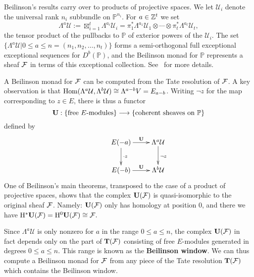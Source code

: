 \documentclass[twoside,12pt, leqno]{amsart}
\def\PP{{\mathbb P}}
\DeclareMathOperator{\rH}{{\rm H}}
\def\bT{{\bf T}}
\def\bU{{\bf U}}
\def\rH{{\rm H}}
\def\CU{{\mathcal U}}
\begin{document}


Beilinson's results carry over to products of projective spaces.  We let $\CU_i$ denote the universal rank $n_i$ subbundle on $\PP^{n_i}$.  For $a\in {\mathbb Z}^{t}$ we set
$$
\Lambda^a \CU := \boxtimes_{i=1}^t \Lambda^{a_i} \CU_i=\pi_1^*\Lambda^{a_1}\CU_1 \otimes \cdots \otimes \pi_t^*\Lambda^{a_t} \CU_t,
$$
the tensor product of the pullbacks to $\PP$ of exterior powers of the $\CU_i$. The set $\{\Lambda^a \CU | 0 \leq a \leq n=(n_1,n_2,\dots,n_t)\}$ forms a semi-orthogonal full exceptional exceptional sequences for $D^b(\PP)$, and the Beilinson monad for $\PP$ represents a sheaf ${\mathcal F}$ in terms of this exceptional collection.  See~\cite[\S2]{EES} for more details.

A Beilinson monad for ${\mathcal F}$ can be computed from the Tate resolution of ${\mathcal F}$.  A key observation is that $\Hom(\Lambda^a \CU,\Lambda^b\CU) \cong \Lambda^{a-b} V=E_{a-b}$.  Writing $\neg z$ for the map corresponding to $z\in E$, there is thus a functor
\[
\bU: \{ \hbox{free $E$-modules}\} \longrightarrow \{ \hbox{coherent sheaves on $\PP$} \}  
\] defined by
\[
\xymatrix{
&E(-a)\ar[r]^-{\bU}\ar[d]^-{\cdot z}&\Lambda^a \CU\ar[d]^{\neg z}\\
&E(-b)\ar[r]^-{\bU}&\Lambda^b \CU\\
}
\]
One of Beilinson's main theorems, transposed to the case of a product of projective spaces, shows that the complex $\bU(\sF)$ is quasi-isomorphic to the original sheaf ${\mathcal F}$.  Namely: $\bU(\sF)$ only has homology at position $0$, and there we have $ \rH^* \bU(\sF) = \rH^0 \bU(\sF) \cong \sF.$

Since  $\Lambda^a \CU$ is only nonzero for $a$ in the range $0 \le a \le n$, the complex $\bU(\sF)$ in fact depends only on the  part of $\bT(\sF)$ consisting of free $E$-modules generated in degrees $0\le a \le n$.  This range is known as the {\bf Beilinson window}.  We can thus  compute a Beilinson monad for ${\mathcal F}$ from any piece of the Tate resolution $\bT(\sF)$ which contains the Beilinson window.
\end{document}
